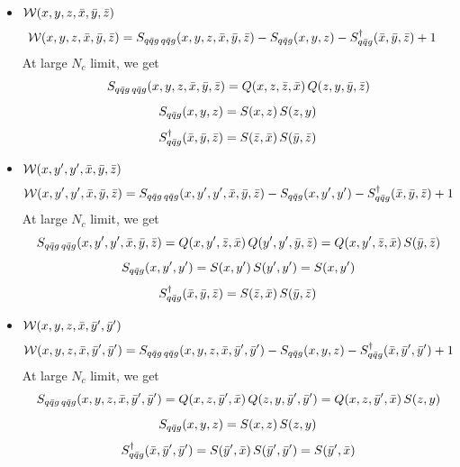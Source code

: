 \documentclass[9pt]{article}
\numberwithin{equation}{section}
\begin{document}
\begin{itemize}
    \item $\mathcal{W}(x,y,z,\Bar{x},\Bar{y},\Bar{z})$
    \begin{align}
        \mathcal{W}(x,y,z,\Bar{x},\Bar{y},\Bar{z}) & = S_{q\Bar{q}g\,q\Bar{q}g}(x,y,z,\Bar{x},\Bar{y},\Bar{z}) -S_{q\Bar{q}g}(x,y,z) - S^{\dagger}_{q\Bar{q}g}(\Bar{x},\Bar{y},\Bar{z}) + 1
    \end{align}
At large $N_{c}$ limit, we get
$$S_{q\Bar{q}g\,q\Bar{q}g}(x,y,z,\Bar{x},\Bar{y},\Bar{z}) = Q(x,z,\Bar{z},\Bar{x})\, Q(z,y,\Bar{y},\Bar{z})$$
$$S_{q\Bar{q}g}(x,y,z) = S(x,z)\, S(z,y)$$
$$S^{\dagger}_{q\Bar{q}g}(\Bar{x},\Bar{y},\Bar{z}) = S(\Bar{z},\Bar{x})\, S(\Bar{y},\Bar{z})$$
\item $\mathcal{W}(x,y',y',\Bar{x},\Bar{y},\Bar{z})$
\begin{align}
        \mathcal{W}(x,y',y',\Bar{x},\Bar{y},\Bar{z}) & = S_{q\Bar{q}g\,q\Bar{q}g}(x,y',y',\Bar{x},\Bar{y},\Bar{z}) -S_{q\Bar{q}g}(x,y',y') - S^{\dagger}_{q\Bar{q}g}(\Bar{x},\Bar{y},\Bar{z}) + 1
    \end{align}
At large $N_{c}$ limit, we get
$$S_{q\Bar{q}g\,q\Bar{q}g}(x,y',y',\Bar{x},\Bar{y},\Bar{z}) = Q(x,y',\Bar{z},\Bar{x})\, Q(y',y',\Bar{y},\Bar{z}) = Q(x,y',\Bar{z},\Bar{x})\, S(\Bar{y},\Bar{z})$$
$$S_{q\Bar{q}g}(x,y',y') = S(x,y')\, S(y',y') = S(x,y') $$
$$S^{\dagger}_{q\Bar{q}g}(\Bar{x},\Bar{y},\Bar{z}) = S(\Bar{z},\Bar{x})\, S(\Bar{y},\Bar{z})$$
\item $\mathcal{W}(x,y,z,\Bar{x},\Bar{y}',\Bar{y}')$
\begin{align}
        \mathcal{W}(x,y,z,\Bar{x},\Bar{y}',\Bar{y}') & = S_{q\Bar{q}g\,q\Bar{q}g}(x,y,z,\Bar{x},\Bar{y}',\Bar{y}') -S_{q\Bar{q}g}(x,y,z) - S^{\dagger}_{q\Bar{q}g}(\Bar{x},\Bar{y}',\Bar{y}') + 1
    \end{align}
At large $N_{c}$ limit, we get
$$S_{q\Bar{q}g\,q\Bar{q}g}(x,y,z,\Bar{x},\Bar{y}',\Bar{y}') = Q(x,z,\Bar{y}',\Bar{x})\, Q(z,y,\Bar{y}',\Bar{y}') = Q(x,z,\Bar{y}',\Bar{x})\, S(z,y) $$
$$S_{q\Bar{q}g}(x,y,z) = S(x,z)\, S(z,y)$$
$$S^{\dagger}_{q\Bar{q}g}(\Bar{x},\Bar{y}',\Bar{y}') = S(\Bar{y}',\Bar{x})\, S(\Bar{y}',\Bar{y}') = S(\Bar{y}',\Bar{x})$$

\end{itemize}
\end{document}
